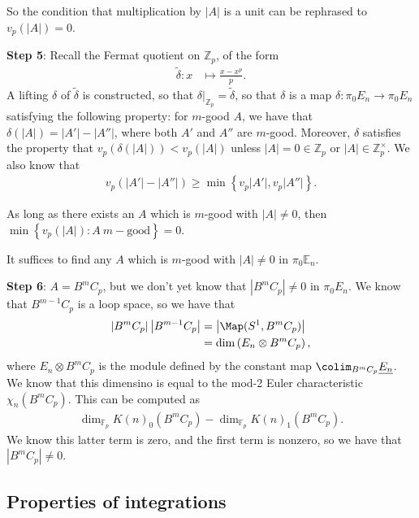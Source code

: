 So the condition that multiplication by $|A|$ is a unit can be rephrased to $v_p(|A|) = 0$.

\textbf{Step 5}: Recall the Fermat quotient on $\mathbb{Z}_p$, of the form
\begin{align*}
    \widetilde{\delta}: x &\mapsto \frac{x - x^p}{p}.
\end{align*}
A lifting $\delta$ of $\widetilde{\delta}$ is constructed, so that $\left. \delta \right|_{ \mathbb{Z}_p } = \widetilde{\delta}$, so that $\delta$ is a map $\delta: \pi_0 E_n \to \pi_0 E_n$ satisfying the following property: for $m$-good $A$, we have that $\delta \left( |A| \right) = |A'| - |A''|$, where both $A'$ and $A''$ are $m$-good. Moreover, $\delta$ satisfies the property that $v_p(\delta(|A|)) < v_p(|A|)$ unless $|A| = 0 \in \mathbb{Z}_p$ or $|A| \in \mathbb{Z}_p^\times$. We also know that
\begin{align*}
    v_p \left( |A'| - |A''| \right) \ge \min \left\{ v_p |A'|, v_p |A''| \right\}.
\end{align*}

As long as there exists an $A$ which is $m$-good with $|A| \ne 0$, then $\min \left\{ v_p(|A|) \colon A\ m-\text{good} \right\} = 0$.

It suffices to find any $A$ which is $m$-good with $|A| \ne 0$ in $\pi_0 \mathbb{E}_n$.

\textbf{Step 6}: $A = B^m C_p$, but we don't yet know that $|B^m C_p| \ne 0$ in $\pi_0 E_n$. We know that $B^{m-1} C_p$ is a loop space, so we have that
\begin{align*}
    \left|B^m C_p \right|\left| B^{m-1} C_p \right| &=  \left| \Map(S^1, B^m C_p) \right| \\
    &= \dim \left( E_n \otimes B^m C_p \right),
\end{align*}
where $E_n \otimes B^m C_p$ is the module defined by the constant map $\colim_{B^m C_p} \underline{E_n}$. We know that this dimensino is equal to the mod-2 Euler characteristic $\chi_n \left( B^m C_p \right)$. This can be computed as
\begin{align*}
    \dim_{\mathbb{F}_p} K(n)_0 \left( B^m C_p \right) - \dim_{\mathbb{F}_p} K(n)_1 \left( B^m C_p \right).
\end{align*}
We know this latter term is zero, and the first term is nonzero, so we have that $|B^m C_p| \ne 0$.

\subsection{Properties of integrations}

